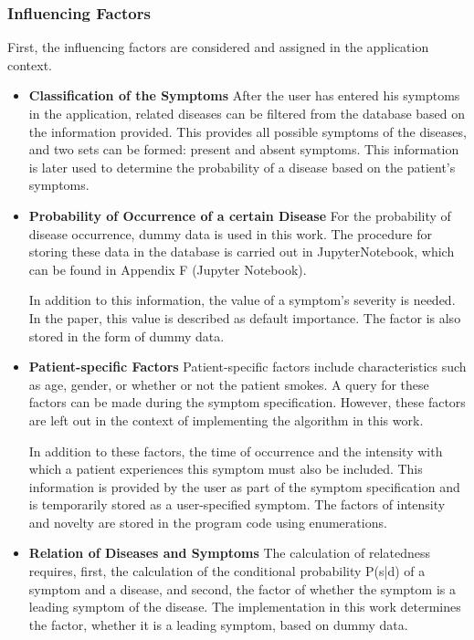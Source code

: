 \subsubsection{Influencing Factors}
First, the influencing factors are considered and assigned in the application context.
\begin{itemize}
	\item \textbf{Classification of the Symptoms}
	\newline
	After the user has entered his symptoms in the application, related diseases can be filtered from the database based on the information provided. This provides all possible symptoms of the diseases, and two sets can be formed: present and absent symptoms. This information is later used to determine the probability of a disease based on the patient's symptoms.
	
	\item \textbf{Probability of Occurrence of a certain Disease}
	\newline
	For the probability of disease occurrence, dummy data is used in this work. The procedure for storing these data in the database is carried out in JupyterNotebook, which can be found in Appendix F (Jupyter Notebook). 
	
	In addition to this information, the value of a symptom's severity is needed. In the paper, this value is described as default importance. The factor is also stored in the form of dummy data.
	
	\item \textbf{Patient-specific Factors}
	\newline
	Patient-specific factors include characteristics such as age, gender, or whether or not the patient smokes. A query for these factors can be made during the symptom specification. However, these factors are left out in the context of implementing the algorithm in this work.
	
	In addition to these factors, the time of occurrence and the intensity with which a patient experiences this symptom must also be included. This information is provided by the user as part of the symptom specification and is temporarily stored as a user-specified symptom. The factors of intensity and novelty are stored in the program code using enumerations. 
	
	\item \textbf{Relation of Diseases and Symptoms}
	\newline
	The calculation of relatedness requires, first, the calculation of the conditional probability P(s|d) of a symptom and a disease, and second, the factor of whether the symptom is a leading symptom of the disease. The implementation in this work determines the factor, whether it is a leading symptom, based on dummy data.
\end{itemize}
